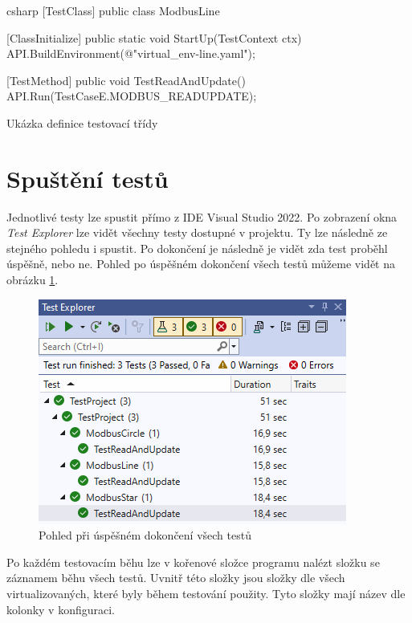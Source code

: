 \begin{listing}[htbp]
    \centering
    \begin{cminted}[breaklines,autogobble, fontsize=\footnotesize]{csharp}
[TestClass]
public class ModbusLine
{
    [ClassInitialize]
    public static void StartUp(TestContext ctx)
    {
        API.BuildEnvironment(@"virtual_env\modbus\topologies\modbus-line.yaml");
    }

    [TestMethod]
    public void TestReadAndUpdate()
    {
        API.Run(TestCaseE.MODBUS_READUPDATE);
    }
}
    \end{cminted}
\caption{Ukázka definice testovací třídy}
\label{listing:test_class}
\end{listing}


\section{Spuštění testů}

Jednotlivé testy lze spustit přímo z IDE Visual Studio 2022\cite{vs2022}. Po zobrazení okna \textit{Test Explorer} lze vidět všechny testy dostupné v projektu. Ty lze následně ze stejného pohledu i spustit. Po dokončení je následně je vidět zda test proběhl úspěšně, nebo ne. Pohled po úspěšném dokončení všech testů můžeme vidět na obrázku \ref{fig:modbus_test_success}. 

\begin{figure}[htbp]
    \centering 
    \includegraphics{assets/img/modbus_test.png}
    \caption{Pohled při úspěšném dokončení všech testů}
    \label{fig:modbus_test_success}
\end{figure}

Po každém testovacím běhu lze v kořenové složce programu nalézt složku se záznamem běhu všech testů. Uvnitř této složky jsou složky dle všech virtualizovaných, které byly během testování použity. Tyto složky mají název dle kolonky  v konfiguraci. 

